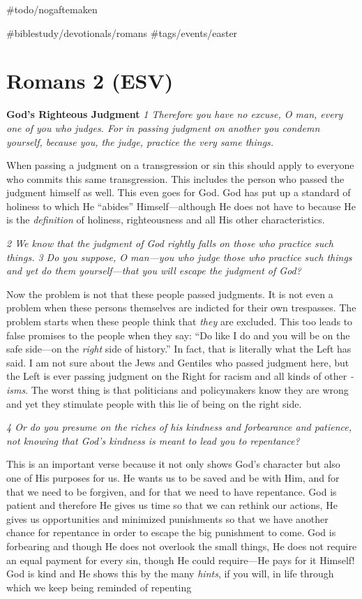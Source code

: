 \#todo/nogaftemaken

\#biblestudy/devotionals/romans \#tags/events/easter

\hypertarget{romans-2-esv}{%
\section{Romans 2 (ESV)}\label{romans-2-esv}}

\textbf{God's Righteous Judgment} \emph{1 Therefore you have no excuse,
O man, every one of you who judges. For in passing judgment on another
you condemn yourself, because you, the judge, practice the very same
things.}

When passing a judgment on a transgression or sin this should apply to
everyone who commits this same transgression. This includes the person
who passed the judgment himself as well. This even goes for God. God has
put up a standard of holiness to which He ``abides'' Himself---although
He does not have to because He is the \emph{definition} of holiness,
righteousness and all His other characteristics.

\emph{2 We know that the judgment of God rightly falls on those who
practice such things. 3 Do you suppose, O man---you who judge those who
practice such things and yet do them yourself---that you will escape the
judgment of God?}

Now the problem is not that these people passed judgments. It is not
even a problem when these persons themselves are indicted for their own
trespasses. The problem starts when these people think that \emph{they}
are excluded. This too leads to false promises to the people when they
say: ``Do like I do and you will be on the safe side---on the
\emph{right} side of history.'' In fact, that is literally what the Left
has said. I am not sure about the Jews and Gentiles who passed judgment
here, but the Left is ever passing judgment on the Right for racism and
all kinds of other \emph{-isms}. The worst thing is that politicians and
policymakers know they are wrong and yet they stimulate people with this
lie of being on the right side.

\emph{4 Or do you presume on the riches of his kindness and forbearance
and patience, not knowing that God's kindness is meant to lead you to
repentance?}

This is an important verse because it not only shows God's character but
also one of His purposes for us. He wants us to be saved and be with
Him, and for that we need to be forgiven, and for that we need to have
repentance. God is patient and therefore He gives us time so that we can
rethink our actions, He gives us opportunities and minimized punishments
so that we have another chance for repentance in order to escape the big
punishment to come. God is forbearing and though He does not overlook
the small things, He does not require an equal payment for every sin,
though He could require---He pays for it Himself! God is kind and He
shows this by the many \emph{hints}, if you will, in life through which
we keep being reminded of repenting

